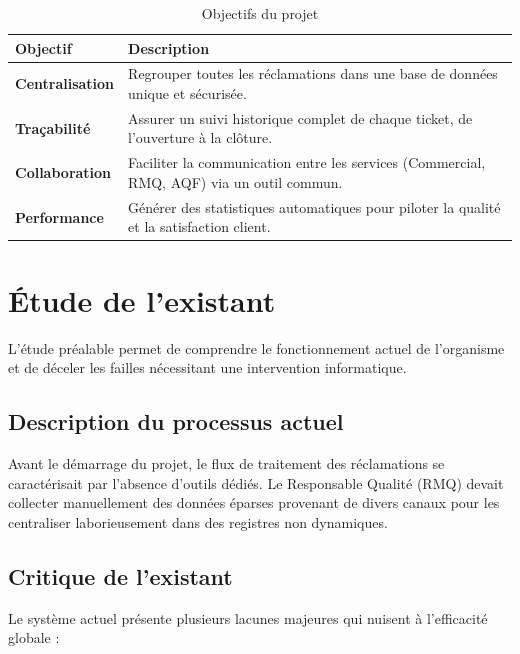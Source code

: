 \begin{table}[H]
    \centering
    \renewcommand{\arraystretch}{1.5}
    \begin{tabular}{|p{4cm}|p{10cm}|}
        \hline
        \rowcolor[HTML]{E9ECEF} 
        \textbf{Objectif} & \textbf{Description} \\ \hline
        \textbf{Centralisation} & Regrouper toutes les réclamations dans une base de données unique et sécurisée. \\ \hline
        \textbf{Traçabilité} & Assurer un suivi historique complet de chaque ticket, de l'ouverture à la clôture. \\ \hline
        \textbf{Collaboration} & Faciliter la communication entre les services (Commercial, RMQ, AQF) via un outil commun. \\ \hline
        \textbf{Performance} & Générer des statistiques automatiques pour piloter la qualité et la satisfaction client. \\ \hline
    \end{tabular}
    \caption{Objectifs du projet}
\end{table}

\section{Étude de l'existant}
L'étude préalable permet de comprendre le fonctionnement actuel de l'organisme et de déceler les failles nécessitant une intervention informatique.

\subsection{Description du processus actuel}
Avant le démarrage du projet, le flux de traitement des réclamations se caractérisait par l'absence d'outils dédiés. Le Responsable Qualité (RMQ) devait collecter manuellement des données éparses provenant de divers canaux pour les centraliser laborieusement dans des registres non dynamiques.

\subsection{Critique de l'existant}
Le système actuel présente plusieurs lacunes majeures qui nuisent à l'efficacité globale :

